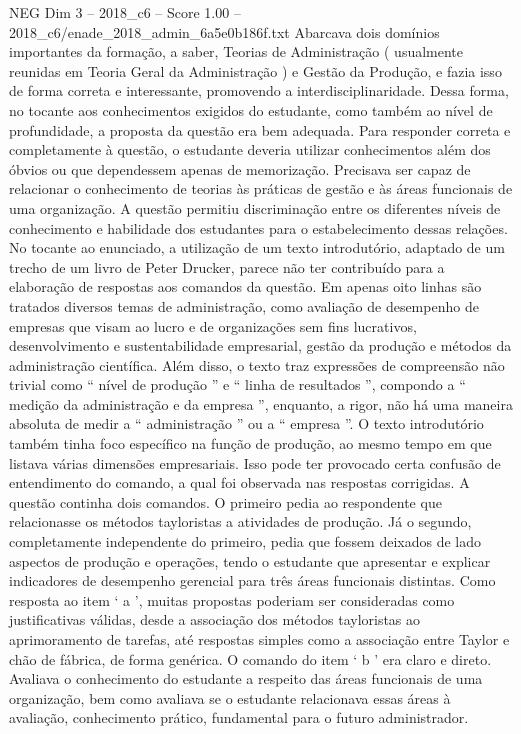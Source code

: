 \begin{textsample}{NEG Dim 3 – 2018\_c6 – Score 1.00 – 2018\_c6/enade\_2018\_admin\_6a5e0b186f.txt}
Abarcava dois domínios importantes da formação, a saber, Teorias de Administração ( usualmente reunidas em Teoria Geral da Administração ) e Gestão da Produção, e fazia isso de forma correta e interessante, promovendo a interdisciplinaridade.
Dessa forma, no tocante aos conhecimentos exigidos do estudante, como também ao nível de profundidade, a proposta da questão era bem adequada.
Para responder correta e completamente à questão, o estudante deveria utilizar conhecimentos além dos óbvios ou que dependessem apenas de memorização.
Precisava ser capaz de relacionar o conhecimento de teorias às práticas de gestão e às áreas funcionais de uma organização.
A questão permitiu discriminação entre os diferentes níveis de conhecimento e habilidade dos estudantes para o estabelecimento dessas relações.
No tocante ao enunciado, a utilização de um texto introdutório, adaptado de um trecho de um livro de Peter Drucker, parece não ter contribuído para a elaboração de respostas aos comandos da questão.
Em apenas oito linhas são tratados diversos temas de administração, como avaliação de desempenho de empresas que visam ao lucro e de organizações sem fins lucrativos, desenvolvimento e sustentabilidade empresarial, gestão da produção e métodos da administração científica.
Além disso, o texto traz expressões de compreensão não trivial como “ nível de produção ” e “ linha de resultados ”, compondo a “ medição da administração e da empresa ”, enquanto, a rigor, não há uma maneira absoluta de medir a “ administração ” ou a “ empresa ”.
O texto introdutório também tinha foco específico na função de produção, ao mesmo tempo em que listava várias dimensões empresariais.
Isso pode ter provocado certa confusão de entendimento do comando, a qual foi observada nas respostas corrigidas.
A questão continha dois comandos.
O primeiro pedia ao respondente que relacionasse os métodos tayloristas a atividades de produção.
Já o segundo, completamente independente do primeiro, pedia que fossem deixados de lado aspectos de produção e operações, tendo o estudante que apresentar e explicar indicadores de desempenho gerencial para três áreas funcionais distintas.
Como resposta ao item ‘ a ’, muitas propostas poderiam ser consideradas como justificativas válidas, desde a associação dos métodos tayloristas ao aprimoramento de tarefas, até respostas simples como a associação entre Taylor e chão de fábrica, de forma genérica.
O comando do item ‘ b ’ era claro e direto.
Avaliava o conhecimento do estudante a respeito das áreas funcionais de uma organização, bem como avaliava se o estudante relacionava essas áreas à avaliação, conhecimento prático, fundamental para o futuro administrador.

\end{textsample}
